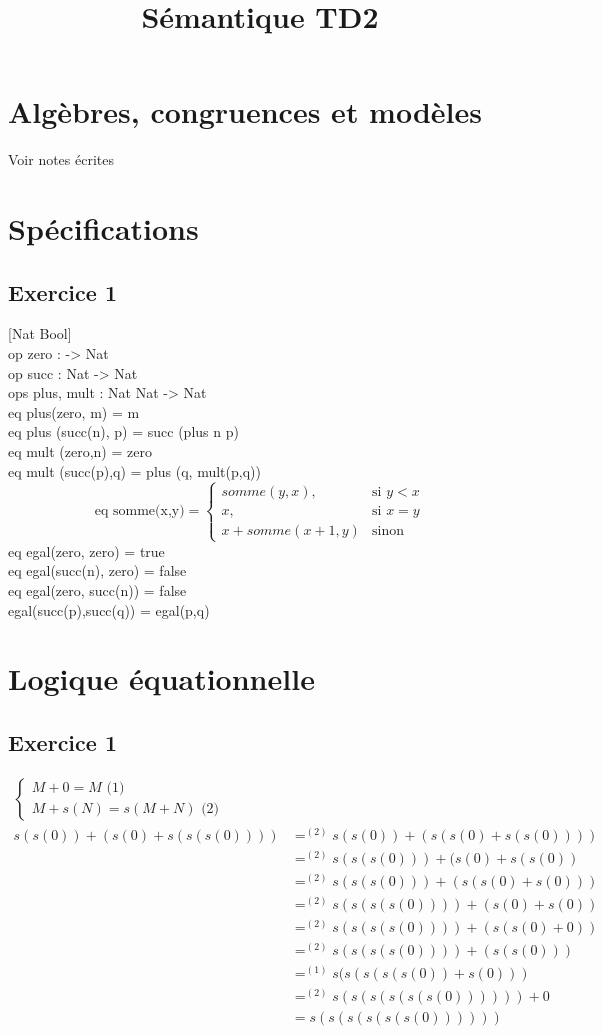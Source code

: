 \documentclass[11pt,a4paper]{article}
\title{Sémantique TD2}
\begin{document}
	\section{Algèbres, congruences et modèles}
	Voir notes écrites
	\section{Spécifications}
	\subsection{Exercice 1}
	[Nat Bool]\\
	
	op zero : -> Nat\\
	op succ : Nat -> Nat\\
	ops plus, mult : Nat Nat -> Nat\\
	eq plus(zero, m) = m\\
	eq plus (succ(n), p) = succ (plus n p)\\
	eq mult (zero,n) = zero\\
	eq mult (succ(p),q) = plus (q, mult(p,q))\\
	\begin{equation*}
	\text{eq somme(x,y)} =\begin{cases}
	somme(y,x), & \text{si $y<x$}\\
	x, & \text{si $x=y$}\\
	x + somme(x+1,y) & \text{sinon}
	\end{cases}
	\end{equation*}
	eq egal(zero, zero) = true\\
	eq egal(succ(n), zero) = false\\
	eq egal(zero, succ(n)) = false\\
	egal(succ(p),succ(q)) = egal(p,q)\\
	\newpage
	\section{Logique équationnelle}
	\subsection{Exercice 1}
	\begin{align*}
	\begin{cases}
	\text{$M + 0 = M$ (1)}\\
	\text{$M + s(N) = s(M + N)$ (2)}
	\end{cases}\\
	s(s(0)) + (s(0) + s(s(s(0)))) &=^{(2)} s(s(0)) + (s(s(0) + s(s(0))))\\
	&=^{(2)} s(s(s(0))) + (s(0) + s(s(0))\\
	&=^{(2)} s(s(s(0))) + (s(s(0) + s(0)))\\
	&=^{(2)} s(s(s(s(0)))) + (s(0) + s(0))\\
	&=^{(2)} s(s(s(s(0)))) + (s(s(0) + 0))\\
	&=^{(2)} s(s(s(s(0)))) + (s(s(0)))\\
	&=^{(1)} s(s(s(s(s(0)) + s(0)))\\
	&=^{(2)} s(s(s(s(s(s(0)))))) + 0\\
	&= s(s(s(s(s(s(0))))))
	\end{align*}
	\newpage
\end{document}
